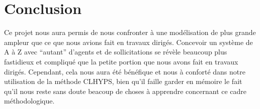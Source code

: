 \documentclass[12pt,a4paper]{article}
\begin{document}
\section{Conclusion}

Ce projet nous aura permis de nous confronter à une modélisation de plus grande
ampleur que ce que nous avions fait en travaux dirigés. Concevoir un système de
A à Z avec \enquote{autant} d'agents et de sollicitations se révèle beaucoup
plus fastidieux et compliqué que la petite portion que nous avons fait en
travaux dirigés. Cependant, cela nous aura été bénéfique et nous à conforté dans
notre utilisation de la méthode CLHYPS, bien qu'il faille garder en mémoire le
fait qu'il nous reste sans doute beacoup de choses à apprendre concernant ce
cadre méthodologique.
\end{document}
